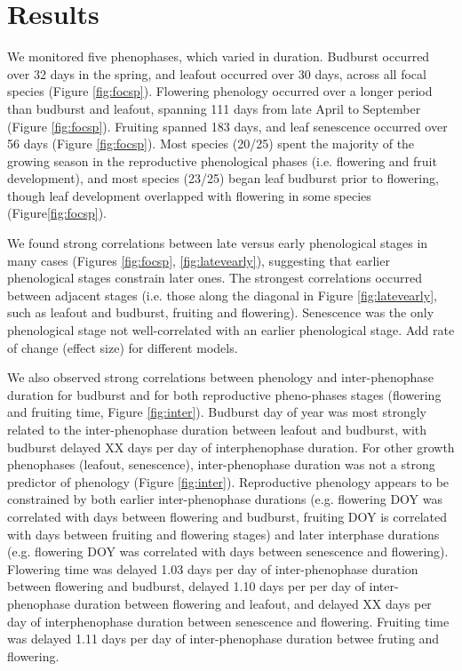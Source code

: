 \documentclass{article}
\begin{document}
\section* {Results}
\par We monitored five phenophases, which varied in duration. Budburst occurred over 32 days in the spring, and leafout occurred over 30 days, across all focal species (Figure \ref{fig:focsp}). Flowering phenology occurred over a longer period than budburst and leafout, spanning 111 days from late April to September (Figure \ref{fig:focsp}). Fruiting spanned 183 days, and leaf senescence occurred over 56 days (Figure \ref{fig:focsp}). %
Most species (20/25) spent the majority of the growing season in the reproductive phenological phases (i.e. flowering and fruit development), and most species (23/25) began leaf budburst prior to flowering, though leaf development overlapped with flowering in some species (Figure\ref{fig:focsp}).
\par We found strong correlations between late versus early phenological stages in many cases (Figures \ref{fig:focsp}, \ref{fig:latevearly}), suggesting that earlier phenological stages constrain later ones. The strongest correlations occurred between adjacent stages (i.e. those along the diagonal in Figure \ref{fig:latevearly}, such as leafout and budburst, fruiting and flowering). Senescence was the only phenological stage not well-correlated with an earlier phenological stage. Add rate of change (effect size) for different models.

\par We also observed strong correlations between phenology and inter-phenophase duration for budburst and for both reproductive pheno-phases stages (flowering and fruiting time, Figure \ref{fig:inter}). Budburst day of year was most strongly related to the inter-phenophase duration between leafout and budburst, with budburst delayed XX days per day of interphenophase duration. For other growth phenophases (leafout, senescence), inter-phenophase duration was not a strong predictor of phenology (Figure \ref{fig:inter}). Reproductive phenology appears to be constrained by both earlier inter-phenophase durations (e.g. flowering DOY was correlated with days between flowering and budburst, fruiting DOY is correlated with days between fruiting and flowering stages) and later interphase durations (e.g. flowering DOY was correlated with days between senescence and flowering). Flowering time was delayed 1.03 days per day of inter-phenophase duration between flowering and budburst, delayed 1.10 days per per day of inter-phenophase duration between flowering and leafout, and delayed XX days per day of interphenophase duration between senescence and flowering.  Fruiting time was delayed 1.11 days per day of inter-phenophase duration betwee fruting and flowering.
\end{document}
